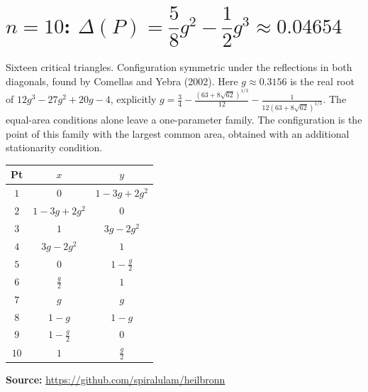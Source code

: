 \documentclass[11pt]{article}
\begin{document}
\section*{$n = 10$: \quad $\Delta(P) = \dfrac{5}{8}g^2-\dfrac{1}{2}g^3 \approx 0.04654$}

Sixteen critical triangles. Configuration symmetric under the reflections in
both diagonals, found by Comellas and Yebra (2002). Here $g\approx 0.3156$ is the real root of
$12g^3-27g^2+20g-4$, explicitly
$g=\frac34-\frac{(63+8\sqrt{62})^{1/3}}{12}-\frac{1}{12(63+8\sqrt{62})^{1/3}}$.
The equal-area conditions alone leave a one-parameter family. The configuration
is the point of this family with the largest common area, obtained with an
additional stationarity condition.

\begin{center}
\begin{tabular}{c c c}
\toprule
Pt & $x$ & $y$ \\
\midrule
$1$ & $0$ & $1-3g+2g^2$ \\[4pt]
$2$ & $1-3g+2g^2$ & $0$ \\[4pt]
$3$ & $1$ & $3g-2g^2$ \\[4pt]
$4$ & $3g-2g^2$ & $1$ \\[4pt]
$5$ & $0$ & $1-\frac{g}{2}$ \\[4pt]
$6$ & $\frac{g}{2}$ & $1$ \\[4pt]
$7$ & $g$ & $g$ \\[4pt]
$8$ & $1-g$ & $1-g$ \\[4pt]
$9$ & $1-\frac{g}{2}$ & $0$ \\[4pt]
$10$ & $1$ & $\frac{g}{2}$ \\
\bottomrule
\end{tabular}
\end{center}

\bigskip\noindent
\textbf{Source:}
\url{https://github.com/spiralulam/heilbronn}
\end{document}
